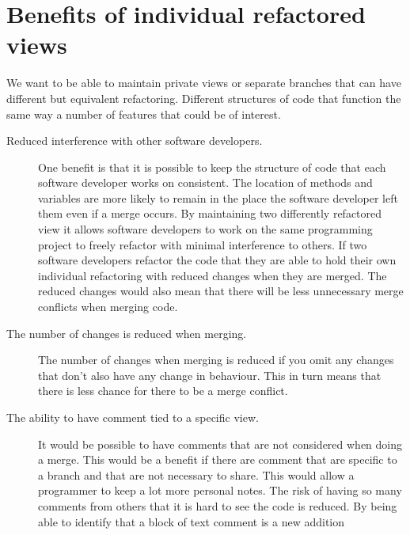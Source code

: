 
\section{Benefits of individual refactored views}
We want to be able to maintain private views or separate branches that can have different but equivalent refactoring. Different structures of code that function the same way a number of features that could be of interest.

\begin{description}

\item [Reduced interference with other software developers.]   
One benefit is that it is possible to keep the structure of code that each software developer works on consistent.  The location of methods and variables are more likely to remain in the place the software developer left them even if a merge occurs.
By maintaining two differently refactored view it allows software developers to work on the same programming project to freely refactor with minimal interference to others.
If two software developers refactor the code that they are able to hold their own individual refactoring with reduced changes when they are merged.
The reduced changes would also mean that there will be less unnecessary merge conflicts when merging code.
  
\item [The number of changes is reduced when merging.] 
The number of changes when merging is reduced if you omit any changes that don't also have any change in behaviour.  This in turn means that there is less chance for there to be a merge conflict.
  
\item [The ability to have comment tied to a specific view.] 
It would be possible to have comments that are not considered when doing a merge. This would be a benefit if there are comment that are specific to a branch and that are not necessary to share.  This would allow a programmer to keep a lot more personal notes.  The risk of having so many comments from others that it is hard to see the code is reduced. By being able to identify that a block of text comment is a new addition

\end{description}

